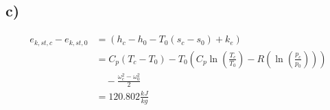 

\subsection*{c)}

\begin{align*}
e_{k,st,c} - e_{k,st,0} &= (h_c - h_0 - T_0(s_c - s_0) + k_e) \\
&= C_p(T_c - T_0) - T_0 \left( C_p \ln \left( \frac{T_c}{T_0} \right) - R \left( \ln \left( \frac{p_c}{p_0} \right) \right) \right) \\
&\quad - \frac{\omega_c^2 - \omega_0^2}{2} \\
&= 120.802 \frac{kJ}{kg}
\end{align*}
